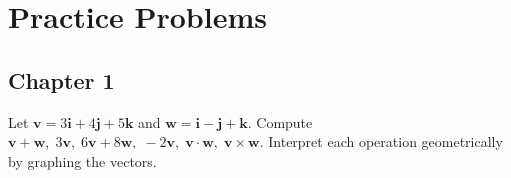 \documentclass[openany]{book}
\begin{document}
\chapter{Practice Problems}








\section{Chapter 1}



\begin{prob}[1]
    Let \( \mathbf{v} = 3\mathbf{i} + 4\mathbf{j} + 5\mathbf{k} \) and \( \mathbf{w} = \mathbf{i} - \mathbf{j} + \mathbf{k} \). Compute  
    \( \mathbf{v} + \mathbf{w},\; 3\mathbf{v},\; 6\mathbf{v} + 8\mathbf{w},\; -2\mathbf{v},\; \mathbf{v} \cdot \mathbf{w},\; \mathbf{v} \times \mathbf{w} \).  
    Interpret each operation geometrically by graphing the vectors.
\end{prob}
\end{document}
